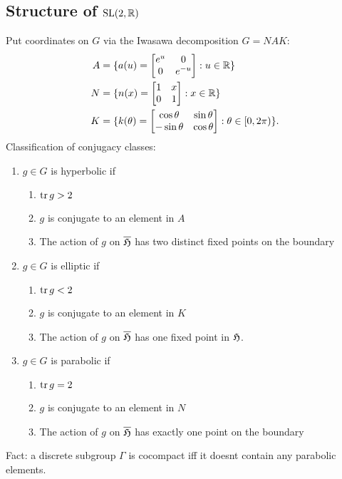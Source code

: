 \documentclass[11pt]{amsart}
\newcommand{\amat}[1] {\Tbt{e^{#1}}{0}{0}{e^{-#1}}}
\newcommand{\nmat}[1]{\Tbt{1}{#1}{0}{1}}
\newcommand{\kmat}[1]{\Tbt{\cos #1}{\sin #1}{-\sin #1}{\cos #1}}
\begin{document}
\subsection{Structure of $\operatorname{SL}(2,\mathbb{R})$}
	Put coordinates on $G$ via the Iwasawa decomposition $G=NAK$:
	\begin{align*}
		A&=\{ a(u)=\amat{u}: u\in \R\}  \\ 
		N&=\{ n(x)=\nmat{x}: x \in \R\} \\
		K&= \{ k(\theta)=\kmat{\theta}: \theta \in [0,2\pi)\}. 
	\end{align*}
	Classification of conjugacy classes: 
	\begin{enumerate}
		\item $g \in G$ is hyperbolic if 
			\begin{enumerate}
				\item $\operatorname{tr} g >2$ 
				\item $g$ is conjugate to an element in $A$
				\item The action of $g$ on $\overline{\mathfrak{H}}$ has two distinct fixed points on the boundary
			\end{enumerate}
				\item $g \in G$ is elliptic if 
			\begin{enumerate}
				\item $\operatorname{tr} g <2$ 
				\item $g$ is conjugate to an element in $K$
				\item The action of $g$ on $\overline{\mathfrak{H}}$ has one fixed point in $\mathfrak{H}$. 
			\end{enumerate}
					\item $g \in G$ is parabolic if 
			\begin{enumerate}
				\item $\operatorname{tr} g =2$ 
				\item $g$ is conjugate to an element in $N$
				\item The action of $g$ on $\overline{\mathfrak{H}}$ has exactly one point on the boundary
			\end{enumerate}
	\end{enumerate}
	Fact: a discrete subgroup $\Gamma$ is cocompact iff it doesnt contain any parabolic elements.
	
\end{document}
